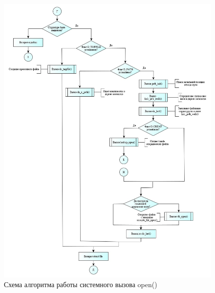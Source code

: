 \begin{figure}[h!]
	\caption{Схема алгоритма работы системного вызова open()}
	\center\includegraphics[scale=0.85]{img/4.jpg}
	
\end{figure}

